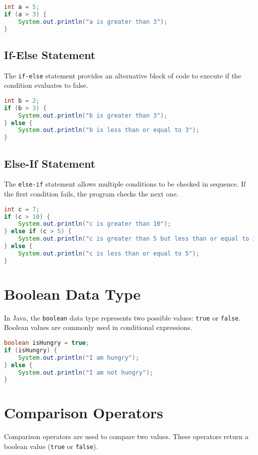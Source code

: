 \documentclass{article}
\begin{document}
\begin{lstlisting}[language=Java]
int a = 5;
if (a > 3) {
    System.out.println("a is greater than 3");
}
\end{lstlisting}

\subsection{If-Else Statement}
The \texttt{if-else} statement provides an alternative block of code to execute if the condition evaluates to false.

\begin{lstlisting}[language=Java]
int b = 2;
if (b > 3) {
    System.out.println("b is greater than 3");
} else {
    System.out.println("b is less than or equal to 3");
}
\end{lstlisting}

\subsection{Else-If Statement}
The \texttt{else-if} statement allows multiple conditions to be checked in sequence. If the first condition fails, the program checks the next one.

\begin{lstlisting}[language=Java]
int c = 7;
if (c > 10) {
    System.out.println("c is greater than 10");
} else if (c > 5) {
    System.out.println("c is greater than 5 but less than or equal to 10");
} else {
    System.out.println("c is less than or equal to 5");
}
\end{lstlisting}

\section{Boolean Data Type}
In Java, the \texttt{boolean} data type represents two possible values: \texttt{true} or \texttt{false}. Boolean values are commonly used in conditional expressions.

\begin{lstlisting}[language=Java]
boolean isHungry = true;
if (isHungry) {
    System.out.println("I am hungry");
} else {
    System.out.println("I am not hungry");
}
\end{lstlisting}

\section{Comparison Operators}
Comparison operators are used to compare two values. These operators return a boolean value (\texttt{true} or \texttt{false}).
\end{document}
